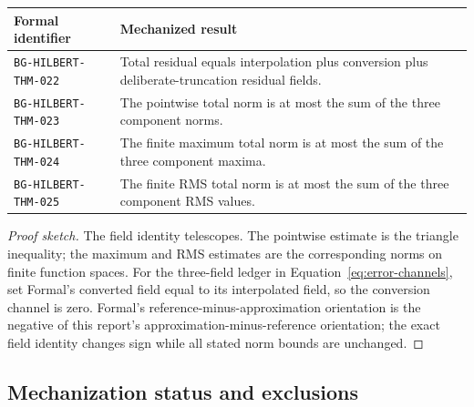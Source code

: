 \documentclass[11pt]{article}
\begin{document}
\begin{center}\small
\begin{tabularx}{\textwidth}{>{\raggedright\arraybackslash}p{}Y}
\toprule
Formal identifier & Mechanized result \\
\midrule
\texttt{BG-HILBERT-THM-022} & Total residual equals interpolation plus conversion plus deliberate-truncation residual fields. \\
\texttt{BG-HILBERT-THM-023} & The pointwise total norm is at most the sum of the three component norms. \\
\texttt{BG-HILBERT-THM-024} & The finite maximum total norm is at most the sum of the three component maxima. \\
\texttt{BG-HILBERT-THM-025} & The finite RMS total norm is at most the sum of the three component RMS values. \\
\bottomrule
\end{tabularx}
\end{center}

\begin{proof}[Proof sketch]
The field identity telescopes. The pointwise estimate is the triangle inequality; the
maximum and RMS estimates are the corresponding norms on finite function spaces. For the
three-field ledger in Equation~\eqref{eq:error-channels}, set Formal's converted field
equal to its interpolated field, so the conversion channel is zero. Formal's
reference-minus-approximation orientation is the negative of this report's
approximation-minus-reference orientation; the exact field identity changes sign while
all stated norm bounds are unchanged.
\end{proof}

\subsection{Mechanization status and exclusions}
\end{document}
